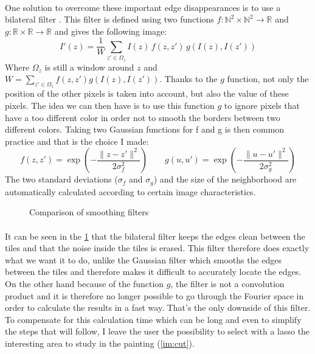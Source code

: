\documentclass[11pt]{article}
\newcommand{\N}{\mathbb{N}}
\newcommand{\R}{\mathbb{R}}
\begin{document}
	\paragraph{}
	One solution to overcome these important edge disappearances is to use a bilateral filter \cite{bil}. This filter is defined using two functions $f: \N^2 \times \N^2 \rightarrow \R$ and $g: \R \times \R \rightarrow \R$ and gives the following image:
	$$ I'(z) = \dfrac{1}{W} \sum_{z' \in \Omega_{z}} I(z) \, f(z, z') \, g \left( I(z), I(z') \right) $$
	Where $\Omega_{z}$ is still a window around $z$ and $W = \sum_{z' \in \Omega_{z}} f(z, z') g(I(z), I(z'))$. Thanks to the $g$ function, not only the position of the other pixels is taken into account, but also the value of these pixels. The idea we can then have is to use this function $g$ to ignore pixels that have a too different color in order not to smooth the borders between two different colors. Taking two Gaussian functions for f and g is then common practice and that is the choice I made:
	$$ f(z, z') = \exp \left( - \dfrac{\| z - z'\|^2}{2 \sigma_f^2} \right) \qquad g(u, u') = \exp \left( - \dfrac{\| u - u'\|^2}{2 \sigma_g^2} \right) $$
	The two standard deviations ($\sigma_f$ and $\sigma_g$) and the size of the neighborhood are automatically calculated according to certain image characteristics.
	
	\begin{figure}[h]
		\centering
		\vspace{-1mm}
		\caption{Comparison of smoothing filters}
		\label{im:smooths}
	\end{figure}
	\vspace{-1mm}

	\paragraph{}
	It can be seen in the \figurename \ref{im:smooths} that the bilateral filter keeps the edges clean between the tiles and that the noise inside the tiles is erased. This filter therefore does exactly what we want it to do, unlike the Gaussian filter which smooths the edges between the tiles and therefore makes it difficult to accurately locate the edges. On the other hand because of the function $g$, the filter is not a convolution product and it is therefore no longer possible to go through the Fourier space in order to calculate the results in a fast way. That's the only downside of this filter. To compensate for this calculation time which can be long and even to simplify the steps that will follow, I leave the user the possibility to select with a lasso the interesting area to study in the painting (\figurename \ref{im:cut}).
	
\end{document}
